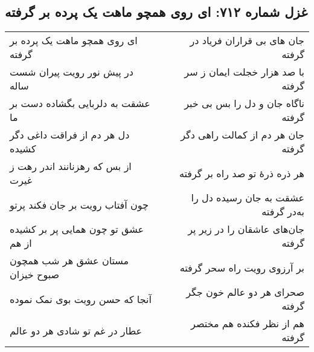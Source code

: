 \begin{center}
\section*{غزل شماره ۷۱۲: ای روی همچو ماهت یک پرده بر گرفته}
\label{sec:712}
\begin{longtable}{l p{0.5cm} r}
ای روی همچو ماهت یک پرده بر گرفته
&&
جان های بی قراران فریاد در گرفته
\\
در پیش نور رویت پیران شست ساله
&&
با صد هزار خجلت ایمان ز سر گرفته
\\
عشقت به دلربایی بگشاده دست بر ما
&&
ناگاه جان و دل را بس بی خبر گرفته
\\
دل هر دم از فراقت داغی دگر کشیده
&&
جان هر دم از کمالت راهی دگر گرفته
\\
از بس که رهزنانند اندر رهت ز غیرت
&&
هر ذره ذرهٔ تو صد راه بر گرفته
\\
چون آفتاب رویت بر جان فکند پرتو
&&
عشقت به جان رسیده دل را به‌در گرفته
\\
عشق تو چون همایی پر بر کشیده از هم
&&
جان‌های عاشقان را در زیر پر گرفته
\\
مستان عشق هر شب همچون صبوح خیزان
&&
بر آرزوی رویت راه سحر گرفته
\\
آنجا که حسن رویت بوی نمک نموده
&&
صحرای هر دو عالم خون جگر گرفته
\\
عطار در غم تو شادی هر دو عالم
&&
هم از نظر فکنده هم مختصر گرفته
\\
\end{longtable}
\end{center}
